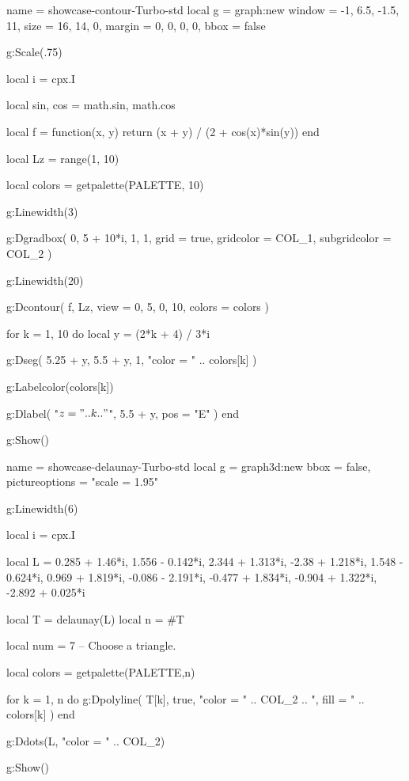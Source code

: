 \documentclass{tutodoc}
\newcommand{\PALETTE}{Turbo}
\begin{document}
\begin{luadraw}{name = showcase-contour-\PALETTE-std}
local g = graph:new{
  window = {-1, 6.5, -1.5, 11},
  size   = {16, 14, 0},
  margin = {0, 0, 0, 0},
  bbox   = false
}

g:Scale(.75)

local i = cpx.I

local sin, cos = math.sin, math.cos

local f = function(x, y)
  return (x + y) / (2 + cos(x)*sin(y))
end

local Lz = range(1, 10)

local colors = getpalette(PALETTE, 10)

g:Linewidth(3)

g:Dgradbox(
  {0, 5 + 10*i, 1, 1},
  {
    grid         = true,
    gridcolor    = COL_1,
    subgridcolor = COL_2
  }
)

g:Linewidth(20)

g:Dcontour(
  f,
  Lz,
  {
    view   = {0, 5, 0, 10},
    colors = colors
  }
)

for k = 1, 10 do
  local y = (2*k + 4) / 3*i

  g:Dseg(
    {5.25 + y, 5.5 + y},
    1,
    "color = " .. colors[k]
  )

  g:Labelcolor(colors[k])

  g:Dlabel(
    "$z = " .. k .. "$",
    5.5 + y,
    {pos = "E"}
  )
end

g:Show()
\end{luadraw}



\vfill

\begin{luadraw}{name = showcase-delaunay-\PALETTE-std}
local g = graph3d:new{
  bbox           = false,
  pictureoptions = "scale = 1.95"
}

g:Linewidth(6)

local i = cpx.I

local L = {
   0.285 + 1.46*i,
   1.556 - 0.142*i,
   2.344 + 1.313*i,
  -2.38  + 1.218*i,
   1.548 - 0.624*i,
   0.969 + 1.819*i,
  -0.086 - 2.191*i,
  -0.477 + 1.834*i,
  -0.904 + 1.322*i,
  -2.892 + 0.025*i
}

local T = delaunay(L)
local n = #T

local num = 7 -- Choose a triangle.

local colors = getpalette(PALETTE,n)

for k = 1, n do
  g:Dpolyline(
    T[k],
    true,
       "color = " .. COL_2
    .. ", fill = " .. colors[k]
  ) 
end

g:Ddots(L, "color = " .. COL_2)

g:Show()
\end{luadraw}
\end{document}
